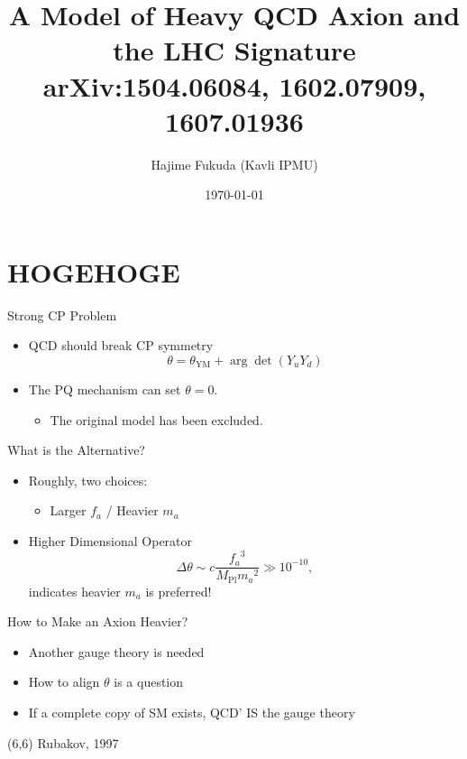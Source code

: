 \documentclass[17pt,ignorenonframetext,]{beamer}
\title{A Model of Heavy QCD Axion and the LHC Signature
\hfil\tiny arXiv:1504.06084, 1602.07909, 1607.01936}
\author{Hajime Fukuda (Kavli IPMU)}
\date{\today}
\providecommand{\tightlist}{%
  \setlength{\itemsep}{0pt}\setlength{\parskip}{0pt}}
\begin{document}
\frame{\titlepage}

\section{HOGEHOGE}

\begin{frame}{Strong CP Problem}

\begin{itemize}
\tightlist
\item
  QCD should break CP symmetry \[
  \theta = \theta_\text{YM} + \arg\det(Y_uY_d)
  \]
\item
  The PQ mechanism can set \(\theta=0\).

  \begin{itemize}
  \tightlist
  \item
    The original model has been excluded.
  \end{itemize}
\end{itemize}

\end{frame}

\begin{frame}{What is the Alternative?}

\begin{itemize}
\tightlist
\item
  Roughly, two choices:

  \begin{itemize}
  \tightlist
  \item
    Larger \(f_a\) / Heavier \(m_a\)
  \end{itemize}
\item
  Higher Dimensional Operator \[
  \Delta \theta \sim c\frac{{f_a}^3}{M_\text{Pl}{m_a}^2} \gg 10^{-10},
  \] indicates heavier \(m_a\) is preferred!
\end{itemize}

\end{frame}

\begin{frame}{How to Make an Axion Heavier?}

\begin{itemize}
\tightlist
\item
  Another gauge theory is needed
\item
  How to align \(\theta\) is a question
\item
  If a complete copy of SM exists, QCD' IS the gauge theory
\end{itemize}

\begin{textblock}{3}(6,6)
\fontsize{10pt}{0pt}\selectfont Rubakov, 1997
\end{textblock}

\end{frame}
\end{document}
